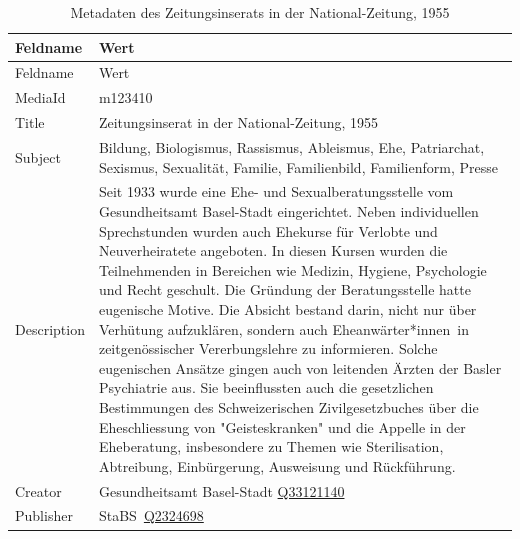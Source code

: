 \documentclass[
  nswissgerman,
  letterpaper,
  DIV=11,
  numbers=noendperiod]{scrartcl}
\begin{document}
\begin{longtable}[]{@{}
  >{\raggedright\arraybackslash}p{}
  >{\raggedright\arraybackslash}p{}@{}}
\caption{Metadaten des Zeitungsinserats in der National-Zeitung,
1955}\label{tbl-metadaten-zeitungsinserat-in-der-national-zeitung-1955}\tabularnewline
\toprule\noalign{}
\begin{minipage}[b]{\linewidth}\raggedright
Feldname
\end{minipage} & \begin{minipage}[b]{\linewidth}\raggedright
Wert
\end{minipage} \\
\midrule\noalign{}
\endfirsthead
\toprule\noalign{}
\begin{minipage}[b]{\linewidth}\raggedright
Feldname
\end{minipage} & \begin{minipage}[b]{\linewidth}\raggedright
Wert
\end{minipage} \\
\midrule\noalign{}
\endhead
\bottomrule\noalign{}
\endlastfoot
MediaId & m123410 \\
Title & Zeitungsinserat in der National-Zeitung, 1955 \\
Subject & Bildung, Biologismus, Rassismus, Ableismus, Ehe, Patriarchat,
Sexismus, Sexualität, Familie, Familienbild, Familienform, Presse \\
Description & Seit 1933 wurde eine Ehe- und Sexualberatungsstelle vom
Gesundheitsamt Basel-Stadt eingerichtet. Neben individuellen
Sprechstunden wurden auch Ehekurse für Verlobte und Neuverheiratete
angeboten. In diesen Kursen wurden die Teilnehmenden in Bereichen wie
Medizin, Hygiene, Psychologie und Recht geschult. Die Gründung der
Beratungsstelle hatte eugenische Motive. Die Absicht bestand darin,
nicht nur über Verhütung aufzuklären, sondern auch Eheanwärter*innen~in
zeitgenössischer Vererbungslehre zu informieren. Solche eugenischen
Ansätze gingen auch von leitenden Ärzten der Basler Psychiatrie aus. Sie
beeinflussten auch die gesetzlichen Bestimmungen des Schweizerischen
Zivilgesetzbuches über die Eheschliessung von "Geisteskranken" und die
Appelle in der Eheberatung, insbesondere zu Themen wie Sterilisation,
Abtreibung, Einbürgerung, Ausweisung und Rückführung. \\
Creator & Gesundheitsamt Basel-Stadt
\href{https://www.wikidata.org/wiki/Q33121140}{Q33121140} \\
Publisher &
StaBS~\href{https://www.wikidata.org/wiki/Q2324698}{Q2324698} \\

\end{longtable}
\end{document}
